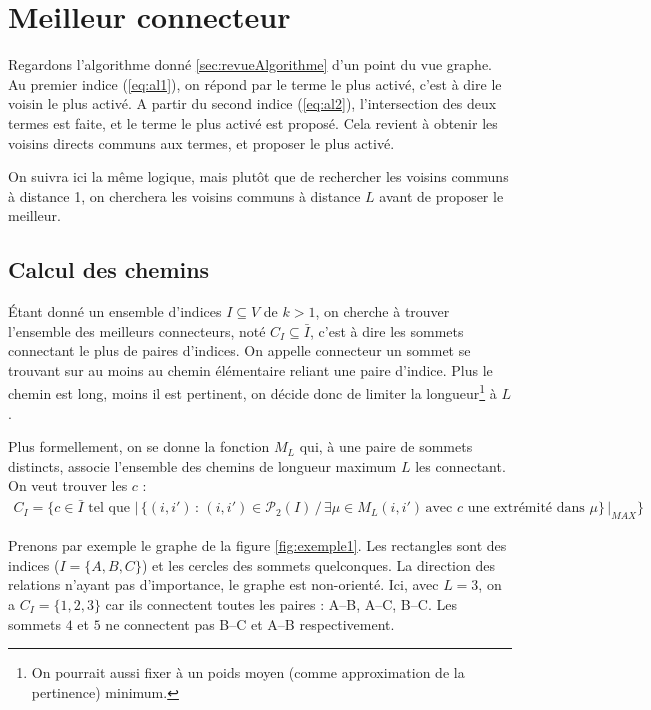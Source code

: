 \chapter{Meilleur connecteur}

Regardons l'algorithme donné \ref{sec:revueAlgorithme} d'un point du vue
graphe.
Au premier indice (\ref{eq:al1}), on répond par le terme le plus activé, c'est
à dire le voisin le plus activé.
A partir du second indice (\ref{eq:al2}), l'intersection des deux termes est
faite, et le terme le plus activé est proposé. Cela revient à obtenir les
voisins directs communs aux termes, et proposer le plus activé.

On suivra ici la même logique, mais plutôt que de rechercher les voisins
communs à distance 1, on cherchera les voisins communs à distance $L$ avant
de proposer le meilleur.


\section{Calcul des chemins}

Étant donné un ensemble d'indices $I \subseteq V$ de $k > 1$, on cherche à
trouver l'ensemble des meilleurs connecteurs, noté $C_{I} \subseteq \bar{I}$,
c'est à dire les sommets connectant le plus de paires d'indices.
On appelle connecteur un sommet se trouvant sur au moins au chemin
élémentaire reliant une paire d'indice.
Plus le chemin est long, moins il est pertinent, on décide donc de limiter la
longueur\footnote{On pourrait aussi fixer à un poids moyen (comme
approximation de la pertinence) minimum.} à $L$.

\medskip

Plus formellement, on se donne la fonction $M_{L}$ qui, à une paire de sommets
distincts, associe l'ensemble des chemins de longueur maximum $L$
les connectant.
On veut trouver les $c$ :
\begin{align*}
	C_{I} = \{ c \in \bar{I} \text{ tel que } | \, \{ (i, i') \, : \, (i, i') \in \mathcal{P}_{2}(I) \, / \, \exists \mu \in M_{L}(i, i') \, \text{avec } c \text{ une extrémité dans } \mu  \} \, |_{MAX}\}
\end{align*}

Prenons par exemple le graphe de la figure \ref{fig:exemple1}.
Les rectangles sont des indices ($I = \{ A, B, C \}$) et les cercles des
sommets quelconques.
La direction des relations n'ayant pas d'importance, le graphe est non-orienté.
Ici, avec $L = 3$, on a $C_{I} = \{1, 2, 3 \}$ car ils connectent toutes les paires :
A--B, A--C, B--C. Les sommets $4$ et $5$ ne connectent pas B--C et A--B
respectivement.

